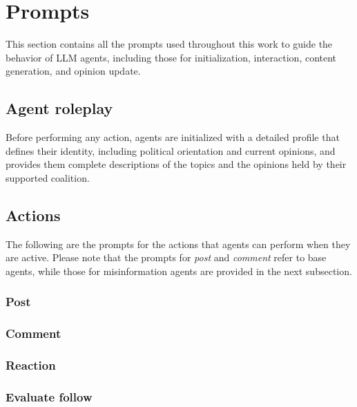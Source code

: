 \appendix

\section{Prompts}
\label{app:prompts}
This section contains all the prompts used throughout this work to guide the behavior of LLM agents, including those for initialization, interaction, content generation, and opinion update.

\subsection{Agent roleplay}
\label{app:agent}
Before performing any action, agents are initialized with a detailed profile that defines their identity, including political orientation and current opinions, and provides them complete descriptions of the topics and the opinions held by their supported coalition.



\subsection{Actions}
\label{app:prompt_actions}
The following are the prompts for the actions that agents can perform when they are active.
Please note that the prompts for \textit{post} and \textit{comment} refer to base agents, while those for misinformation agents are provided in the next subsection.

\subsubsection{Post}


\subsubsection{Comment}


\subsubsection{Reaction}


\subsubsection{Evaluate follow}


